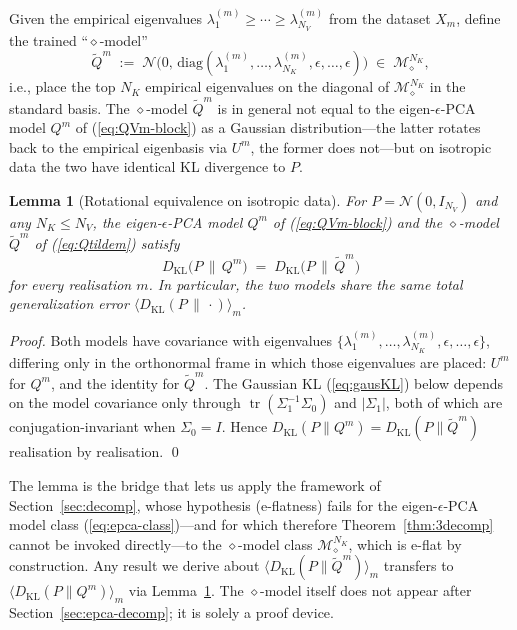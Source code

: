 \documentclass[11pt,a4paper]{article}
\newtheorem{lemma}{Lemma}
\theoremstyle{definition}
\theoremstyle{remark}
\newcommand{\KL}{D_{\mathrm{KL}}}
\newcommand{\PV}{P}
\newcommand{\QVm}{Q^{m}}
\newcommand{\NK}{N_K}
\newcommand{\NV}{N_V}
\newcommand{\Mfam}{\mathcal{M}}
\newcommand{\tr}{\operatorname{tr}}
\begin{document}
Given the empirical eigenvalues
$\lambda_{1}^{(m)} \geq \cdots \geq \lambda_{\NV}^{(m)}$ from the
dataset $X_{m}$, define the trained ``$\diamond$-model''
\begin{equation}
  \widetilde{Q}^{m}
  \;:=\;
  \mathcal{N}\!\big(0,\, \mathrm{diag}(\lambda_{1}^{(m)},\ldots,
                                        \lambda_{\NK}^{(m)},
                                        \epsilon,\ldots,\epsilon)\big)
  \;\in\;\Mfam_{\diamond}^{\NK} ,
  \label{eq:Qtildem}
\end{equation}
i.e., place the top $\NK$ empirical eigenvalues on the diagonal
of $\Mfam_{\diamond}^{\NK}$ in the standard basis. The
$\diamond$-model $\widetilde{Q}^{m}$ is in general not equal
to the eigen-$\epsilon$-PCA model $\QVm$ of (\ref{eq:QVm-block})
as a Gaussian distribution---the latter rotates back to the
empirical eigenbasis via $U^{m}$, the former does not---but on
isotropic data the two have identical KL divergence to $\PV$.

\begin{lemma}[Rotational equivalence on isotropic data]
\label{lem:rot-equiv}
For $\PV = \mathcal{N}(0, I_{\NV})$ and any $\NK \leq \NV$, the
eigen-$\epsilon$-PCA model $\QVm$ of (\ref{eq:QVm-block}) and the
$\diamond$-model $\widetilde{Q}^{m}$ of (\ref{eq:Qtildem})
satisfy
\begin{equation}
  \KL\!\big(\PV \,\big\|\, \QVm\big)
  \;=\;
  \KL\!\big(\PV \,\big\|\, \widetilde{Q}^{m}\big)
  \label{eq:rot-equiv}
\end{equation}
for every realisation $m$. In particular, the two models share
the same total generalization error
$\langle\KL(\PV \,\|\, \cdot)\rangle_{m}$.
\end{lemma}

\begin{proof}
Both models have covariance with eigenvalues
$\{\lambda_{1}^{(m)},\ldots,\lambda_{\NK}^{(m)},\epsilon,
\ldots,\epsilon\}$, differing only in the orthonormal frame in
which those eigenvalues are placed: $U^{m}$ for $\QVm$, and the
identity for $\widetilde{Q}^{m}$. The Gaussian KL
(\ref{eq:gausKL}) below depends on the model covariance only
through $\tr(\Sigma_{1}^{-1}\Sigma_{0})$ and $|\Sigma_{1}|$, both
of which are conjugation-invariant when $\Sigma_{0} = I$. Hence
$\KL(\PV\|\QVm) = \KL(\PV\|\widetilde{Q}^{m})$ realisation by
realisation.
\qed
\end{proof}

The lemma is the bridge that lets us apply the framework of
Section~\ref{sec:decomp}, whose hypothesis (e-flatness) fails for
the eigen-$\epsilon$-PCA model class
(\ref{eq:epca-class})---and for which therefore
Theorem~\ref{thm:3decomp} cannot be invoked
directly---to the $\diamond$-model class
$\Mfam_{\diamond}^{\NK}$, which is e-flat by construction. Any
result we derive about $\langle\KL(\PV\|\widetilde{Q}^{m})\rangle_{m}$
transfers to $\langle\KL(\PV\|\QVm)\rangle_{m}$ via
Lemma~\ref{lem:rot-equiv}. The $\diamond$-model itself does not
appear after Section~\ref{sec:epca-decomp}; it is solely a proof
device.
\end{document}
